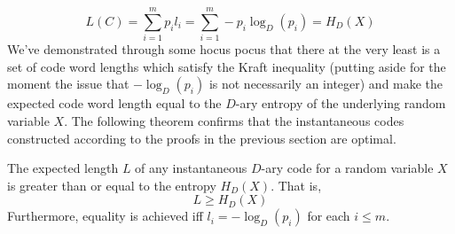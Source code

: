\begin{equation}
    L(C) = \sum_{i=1}^m p_il_i = \sum_{i=1}^m -p_i\log_D(p_i) = H_D(X)
\end{equation}
We've demonstrated through some hocus pocus that there at the very least is a set of code word lengths which satisfy the Kraft inequality (putting aside for the moment the issue that $-\log_D(p_i)$ is not necessarily an integer) and make the expected code word length equal to the $D$-ary entropy of the underlying random variable $X$. The following theorem confirms that the instantaneous codes constructed according to the proofs in the previous section are optimal. 
\begin{theorem}
    The expected length $L$ of any instantaneous $D$-ary code for a random variable $X$ is greater than or equal to the entropy $H_D(X)$. That is,
    \begin{equation}
        L \geq H_D(X)
    \end{equation}
    Furthermore, equality is achieved iff $l_i = -\log_D(p_i)$ for each $i \leq m$. 
\end{theorem}
